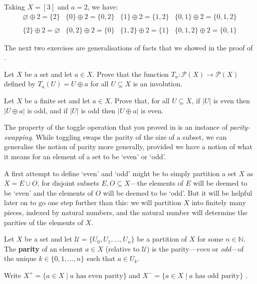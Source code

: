 \begin{example}
Taking $X = [3]$ and $a = 2$, we have:
\[
\begin{matrix}
\varnothing \oplus 2 = \{ 2 \} & \{ 0 \} \oplus 2 = \{ 0, 2 \} & \{ 1 \} \oplus 2 = \{ 1, 2 \} & \{ 0, 1 \} \oplus 2 = \{ 0, 1, 2 \} \\
~&~&~&~ \\
\{ 2 \} \oplus 2 = \varnothing & \{ 0,2 \} \oplus 2 = \{ 0 \} & \{ 1, 2 \} \oplus 2 = \{ 1 \} & \{ 0, 1, 2 \} \oplus 2 = \{ 0, 1 \}
\end{matrix}
\]
\end{example}

The next two exercises are generalisations of facts that we showed in the proof of .

\begin{exercise}
\label{exToggleIsInvolution}
Let $X$ be a set and let $a \in X$. Prove that the function $T_a : \mathcal{P}(X) \to \mathcal{P}(X)$ defined by $T_a(U) = U \oplus a$ for all $U \subseteq X$ is an involution.
\end{exercise}

\begin{exercise}
\label{exToggleSwapsParity}
Let $X$ be a finite set and let $a \in X$. Prove that, for all $U \subseteq X$, if $|U|$ is even then $|U \oplus a|$ is odd, and if $|U|$ is odd then $|U \oplus a|$ is even.
\end{exercise}

The property of the toggle operation that you proved in  is an instance of \textit{parity-swapping}. While toggling swaps the parity of the size of a subset, we can generalise the notion of parity more generally, provided we have a notion of what it means for an element of a set to be `even' or `odd'.

A first attempt to define `even' and `odd' might be to simply partition a set $X$ as $X = E \cup O$, for disjoint subsets $E, O \subseteq X$---the elements of $E$ will be deemed to be `even' and the elements of $O$ will be deemed to be `odd'. But it will be helpful later on to go one step further than this: we will partition $X$ into finitely many pieces, indexed by natural numbers, and the natural number will determine the parities of the elements of $X$.

\begin{definition}
\label{defParity}
Let $X$ be a set and let $\mathcal{U} = \{ U_0, U_1, \dots, U_n \}$ be a partition of $X$ for some $n \in \mathbb{N}$. The \textbf{parity} of an element $a \in X$ (relative to $\mathcal{U}$) is the parity---\textit{even} or \textit{odd}---of the unique $k \in \{ 0, 1, \dots, n \}$ such that $a \in U_k$.

Write $X^+ = \{ a \in X \mid a \text{ has even parity} \}$  and $X^- = \{ a \in X \mid a \text{ has odd parity} \}$ .
\end{definition}

